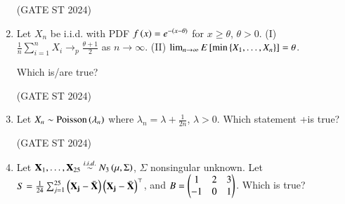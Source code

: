 \documentclass[journal,12pt,onecolumn]{IEEEtran}
\theoremstyle{remark}
\begin{document}
\begin{enumerate}
\begin{enumerate}
\end{enumerate}
\hfill (GATE ST 2024)
\item
Let $X_n$ be i.i.d. with PDF $f\left(x\right) = e^{-(x-\theta)}$ for $x\ge\theta$, $\theta>0$.  
(I) $\frac{1}{n}\sum_{i=1}^n X_i \to_p \frac{\theta+1}{2}$ as $n\to\infty$.  
(II) $\lim_{n\to\infty}E{}\left[\min\left\{X_1,\dots,X_n\right\}\right] = \theta$.  

Which is/are true?

\begin{enumerate}
\end{enumerate}
\hfill (GATE ST 2024)
\item
Let $X_n\sim \text{Poisson}\left(\lambda_n\right)$ where $\lambda_n = \lambda + \frac{1}{2n}$, $\lambda>0$. Which statement +is true?

\begin{enumerate}
\end{enumerate}
\hfill (GATE ST 2024)
\item
Let $\mathbf{X}_1,\dots,\mathbf{X}_{25} \stackrel{i.i.d.}{\sim} N_3\left(\mu,\Sigma\right)$, $\Sigma$ nonsingular unknown.  
Let $S = \frac1{24}\sum_{j=1}^{25} \left(\mathbf{X_j} - \bar{\mathbf{X}}\right) \left(\mathbf{X_j} - \bar{\mathbf{X}}\right)^\top$, and  
$B = \begin{pmatrix} 1 & 2 & 3 \\ -1 & 0 & 1 \end{pmatrix}$.  
Which is true?


\end{enumerate}
\end{document}
